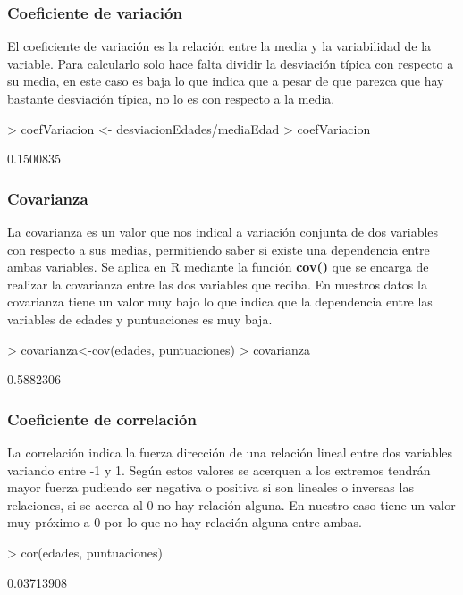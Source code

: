 \documentclass [a4paper] {article}
\begin{document}
\subsubsection{ Coeficiente de variación}
El coeficiente de variación es la relación entre la media y la variabilidad de la variable. Para calcularlo solo hace falta dividir la desviación típica con respecto a su media, en este
caso es baja lo que indica que a pesar de que parezca que hay bastante desviación típica, no lo es con respecto a la media.

\begin{Schunk}
\begin{Sinput}
> coefVariacion <- desviacionEdades/mediaEdad
> coefVariacion
\end{Sinput}
\begin{Soutput}
[1] 0.1500835
\end{Soutput}
\end{Schunk}

\subsubsection{ Covarianza}
La covarianza es un valor que nos indical a variación conjunta de dos variables con respecto a sus medias, permitiendo saber si existe una dependencia entre ambas variables.
Se aplica en R mediante la función \textbf{cov()} que se encarga de realizar la covarianza entre las dos variables que reciba. En nuestros datos la covarianza tiene un valor muy bajo lo
que indica que la dependencia entre las variables de edades y puntuaciones es muy baja.

\begin{Schunk}
\begin{Sinput}
> covarianza<-cov(edades, puntuaciones)  
> covarianza
\end{Sinput}
\begin{Soutput}
[1] 0.5882306
\end{Soutput}
\end{Schunk}

\subsubsection{ Coeficiente de correlación}
La correlación indica la fuerza dirección de una relación lineal entre dos variables variando entre -1 y 1. Según estos valores se acerquen a los extremos tendrán mayor fuerza pudiendo ser negativa
o positiva si son lineales o inversas las relaciones, si se acerca al 0 no hay relación alguna. En nuestro caso tiene un valor muy próximo a 0 por lo que no hay relación alguna entre ambas.

\begin{Schunk}
\begin{Sinput}
> cor(edades, puntuaciones)
\end{Sinput}
\begin{Soutput}
[1] 0.03713908
\end{Soutput}
\end{Schunk}
\end{document}
